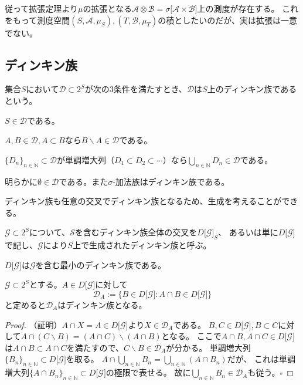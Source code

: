 \documentclass[../root.tex]{subfiles}
\begin{document}
従って拡張定理より$ \mu $の拡張となる$ \mathscr{A}\otimes\mathscr{B}=\sigma\lbrack \mathscr{A}\times\mathscr{B} \rbrack $上の測度が存在する。
これをもって測度空間$ ( S, \mathscr{A}, \mu_{S} ), ( T, \mathscr{B}, \mu_{T} ) $の積としたいのだが、実は拡張は一意でない。




\subsection{ディンキン族}
\begin{Def}{}{}
集合$ S $において$ \mathscr{D}\subset 2^{S} $が次の3条件を満たすとき、$ \mathscr{D} $は$ S $上のディンキン族であるという。
\begin{EnumCond}
\item $ S\in\mathscr{D} $である。
\item $ A, B\in\mathscr{D}, A\subset B $なら$ B\backslash A\in\mathscr{D} $である。
\item $ \lbrace D_{n} \rbrace_{n\in\mathbb{N}}\subset\mathscr{D} $が単調増大列（$ D_{1}\subset D_{2}\subset\dotsm $）なら$ \bigcup_{n\in\mathbb{N}}D_{n}\in\mathscr{D} $である。
\end{EnumCond}
\end{Def}

明らかに$ \emptyset\in\mathscr{D} $である。また$ \sigma $-加法族はディンキン族である。

ディンキン族も任意の交叉でディンキン族となるため、生成を考えることができる。

\begin{Def}{}{}
$ \mathscr{G}\subset 2^{S} $について、$ \mathscr{S} $を含むディンキン族全体の交叉を$ D\lbrack \mathscr{G} \rbrack_{S} $、
あるいは単に$ D\lbrack \mathscr{G} \rbrack $で記し、$ \mathscr{G} $により$ S $上で生成されたディンキン族と呼ぶ。
\end{Def}

$ D\lbrack \mathscr{G} \rbrack $は$ \mathscr{G} $を含む最小のディンキン族である。

\begin{Prop}{}{}
$ \mathscr{G}\subset 2^{S} $とする。$ A\in D\lbrack \mathscr{G} \rbrack $に対して
\[ \mathscr{D}_{A}:=\lbrace B\in D\lbrack \mathscr{G} \rbrack : A\cap B\in D\lbrack \mathscr{G} \rbrack \rbrace \]
と定めると$ \mathscr{D}_{A} $はディンキン族となる。
\end{Prop}

\begin{proof}
（証明）$ A\cap X= A\in D\lbrack \mathscr{G} \rbrack $より$ X\in\mathscr{D}_{A} $である。
$ B, C\in D\lbrack \mathscr{G} \rbrack, B\subset C $に対して$ A\cap ( C\backslash B )=( A\cap C )\backslash( A\cap B ) $となる。
ここで$ A\cap B, A\cap C\in D\lbrack \mathscr{G} \rbrack $は$ A\cap B\subset A\cap C $を満たすので、$ C\backslash B\in\mathscr{D}_{A} $が分かる。
単調増大列$ \lbrace B_{n} \rbrace_{n\in\mathbb{N}}\subset D\lbrack \mathscr{G} \rbrack $を取る。
$ A\cap\bigcup_{n\in\mathbb{N}}B_{n}=\bigcup_{n\in\mathbb{N}}( A\cap B_{n} ) $だが、
これは単調増大列$ \lbrace A\cap B_{n} \rbrace_{n\in\mathbb{N}}\subset D\lbrack \mathscr{G} \rbrack $の極限で表せる。
故に$ \bigcup_{n\in\mathbb{N}}B_{n}\in\mathscr{D}_{A} $も従う。$ \square $
\end{proof}
\end{document}
